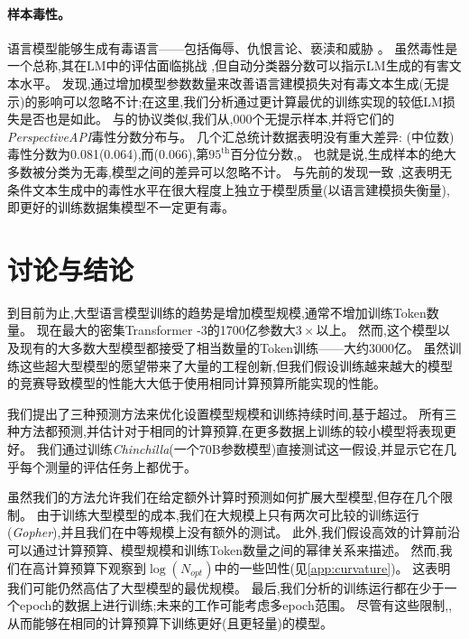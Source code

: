 \documentclass[11pt, a4paper, logo, copyright, nonumbering]{deepmind}
\newcommand{\gopher}{\textit{Gopher}\xspace}
\newcommand{\nummodels}{400 }
\newcommand{\chinchilla}{\textit{Chinchilla}\xspace}
\newcommand{\mtnlg}{MT-NLG 530B\xspace}
\begin{document}
\paragraph{样本毒性。}
语言模型能够生成有毒语言——包括侮辱、仇恨言论、亵渎和威胁 \citep{gehman2020realtoxicityprompts,rae2021gopher}。
虽然毒性是一个总称,其在LM中的评估面临挑战 \citep{xu2021detoxifying,welbl2021challenges},但自动分类器分数可以指示LM生成的有害文本水平。
\citet{rae2021gopher}发现,通过增加模型参数数量来改善语言建模损失对有毒文本生成(无提示)的影响可以忽略不计;在这里,我们分析通过更计算最优的训练实现的较低LM损失是否也是如此。
与\citet{rae2021gopher}的协议类似,我们从,000个无提示样本,并将它们的\textit{PerspectiveAPI}毒性分数分布与。
几个汇总统计数据表明没有重大差异:
(中位数)毒性分数为0.081(0.064),而(0.066),第$95^{\textrm{th}}$百分位分数,。
也就是说,生成样本的绝大多数被分类为无毒,模型之间的差异可以忽略不计。
与先前的发现一致 \citep{rae2021gopher},这表明无条件文本生成中的毒性水平在很大程度上独立于模型质量(以语言建模损失衡量),即更好的训练数据集模型不一定更有毒。

\section{讨论与结论}
到目前为止,大型语言模型训练的趋势是增加模型规模,通常不增加训练Token数量。
现在最大的密集Transformer -3的1700亿参数大$3 \times$以上。
然而,这个模型以及现有的大多数大型模型都接受了相当数量的Token训练——大约3000亿。
虽然训练这些超大型模型的愿望带来了大量的工程创新,但我们假设训练越来越大的模型的竞赛导致模型的性能大大低于使用相同计算预算所能实现的性能。

我们提出了三种预测方法来优化设置模型规模和训练持续时间,基于超过。
所有三种方法都预测,并估计对于相同的计算预算,在更多数据上训练的较小模型将表现更好。
我们通过训练\chinchilla(一个70B参数模型)直接测试这一假设,并显示它在几乎每个测量的评估任务上都优于。

虽然我们的方法允许我们在给定额外计算时预测如何扩展大型模型,但存在几个限制。
由于训练大型模型的成本,我们在大规模上只有两次可比较的训练运行(\gopher),并且我们在中等规模上没有额外的测试。
此外,我们假设高效的计算前沿可以通过计算预算、模型规模和训练Token数量之间的幂律关系来描述。
然而,我们在高计算预算下观察到$\log \left (N_{opt} \right)$中的一些凹性(见\autoref{app:curvature})。
这表明我们可能仍然高估了大型模型的最优规模。
最后,我们分析的训练运行都在少于一个epoch的数据上进行训练;未来的工作可能考虑多epoch范围。
尽管有这些限制,,从而能够在相同的计算预算下训练更好(且更轻量)的模型。
\end{document}
